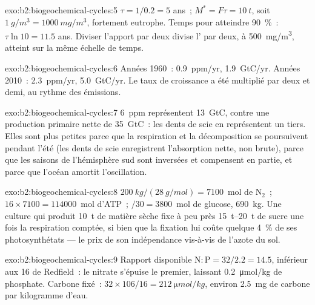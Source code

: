 \begin{solution}{exo:b2:biogeochemical-cycles:5}
$\tau = 1/0.2 = 5$ ans~; $M^{*} = F\tau = \qty{10}{t}$, soit
$\qty{1}{g/m^3} = \qty{1000}{mg/m^3}$, fortement eutrophe. Temps pour
atteindre \qty{90}{\%}~: $\tau\ln 10 = 11.5$ ans. Diviser l'apport par
deux divise l' par deux, à \qty{500}{mg/m^3}, atteint
sur la même échelle de temps.
\end{solution}

\begin{solution}{exo:b2:biogeochemical-cycles:6}
Années 1960~: \qty{0.9}{ppm/yr}, \qty{1.9}{GtC/yr}. Années 2010~:
\qty{2.3}{ppm/yr}, \qty{5.0}{GtC/yr}. Le taux de croissance a été
multiplié par deux et demi, au rythme des émissions.
\end{solution}

\begin{solution}{exo:b2:biogeochemical-cycles:7}
\qty{6}{ppm} représentent \qty{13}{GtC}, contre une production primaire
nette de \qty{35}{GtC}~: les dents de scie en représentent un tiers. Elles
sont plus petites parce que la respiration et la décomposition se
poursuivent pendant l'été (les dents de scie enregistrent l'absorption
nette, non brute), parce que les saisons de l'hémisphère sud sont
inversées et compensent en partie, et parce que l'océan amortit
l'oscillation.
\end{solution}

\begin{solution}{exo:b2:biogeochemical-cycles:8}
$\qty{200}{kg}/(\qty{28}{g/mol}) = 7100$~mol de $\mathrm{N_2}$~; $16\times
7100 = \num{114000}$~mol d'ATP~; $/30 = 3800$~mol de glucose, \qty{690}{kg}.
Une culture qui produit \qty{10}{t} de matière sèche fixe à peu près
\qtyrange{15}{20}{t} de sucre une fois la respiration comptée, si bien
que la fixation lui coûte quelque \qty{4}{\%} de ses photosynthétats ---
le prix de son indépendance vis-à-vis de l'azote du sol.
\end{solution}

\begin{solution}{exo:b2:biogeochemical-cycles:9}
Rapport disponible $\mathrm{N:P} = 32/2.2 = 14.5$, inférieur aux 16 de
Redfield~: le nitrate s'épuise le premier, laissant
\qty{0.2}{\micro mol/kg} de phosphate. Carbone fixé~: $32\times 106/16 =
\qty{212}{\micro mol/kg}$, environ \qty{2.5}{mg} de carbone par
kilogramme d'eau.
\end{solution}

